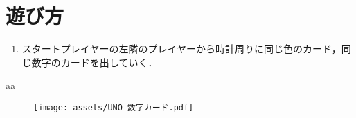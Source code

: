 \documentclass[11pt]{ltjsarticle}
\begin{document}
\section{遊び方}
\begin{enumerate}
  \item スタートプレイヤーの左隣のプレイヤーから時計周りに同じ色のカード，同じ数字のカードを出していく．
\end{enumerate}
aa

\begin{figure}[h]
  \begin{center}
    \texttt{[image: assets/UNO\_数字カード.pdf]}
    \label{fig:数字カードの例}
  \end{center}
\end{figure}

\label{fig:aaa}
\end{document}

